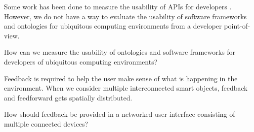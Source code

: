 
Some work has been done to measure the usability of \acp{API} for developers \cite{Robillard2009}. However, we do not have a way to evaluate the usability of software frameworks and ontologies for ubiquitous computing environments from a developer point-of-view. 

\begin{question}
How can we measure the usability of ontologies and software frameworks for developers of ubiquitous computing environments? 
\end{question}

Feedback is required to help the user make sense of what is happening in the environment. When we consider multiple interconnected smart objects, feedback and feedforward gets spatially distributed. 

\begin{question}
How should feedback be provided in a networked user interface consisting of multiple connected devices? 
\end{question}


	






